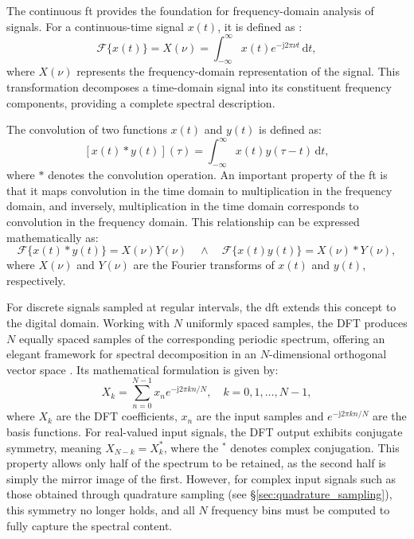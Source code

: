 The continuous \gls{ft} provides the foundation for frequency-domain analysis of signals. For a continuous-time signal $x(t)$, it is defined as \citep[see][Chapter 2]{Bracewell2000}:
\begin{equation}
	\mathcal{F}\{x(t)\} = X(\nu) = \int_{-\infty}^{\infty} x(t) e^{-\mathrm{j}2\pi\nu t} \, \mathrm{d}t ,
\end{equation}
where $X(\nu)$ represents the frequency-domain representation of the signal. This transformation decomposes a time-domain signal into its constituent frequency components, providing a complete spectral description. 

The convolution of two functions $x(t)$ and $y(t)$ is defined as:
\begin{equation}
	\left[x(t) * y(t)\right](\tau) = \int_{-\infty}^{\infty} x(t) y(\tau - t) \, \mathrm{d}t ,
\end{equation}
where $*$ denotes the convolution operation. An important property of the \gls{ft} is that it maps convolution in the time domain to multiplication in the frequency domain, and inversely, multiplication in the time domain corresponds to convolution in the frequency domain. This relationship can be expressed mathematically as:
\begin{equation}
	\mathcal{F}\{x(t) * y(t)\} = X(\nu) Y(\nu)  \quad \land \quad \mathcal{F}\{x(t) y(t)\} = X(\nu) * Y(\nu) ,
	\label{eq:convolution_theorem}
\end{equation}
where $X(\nu)$ and $Y(\nu)$ are the Fourier transforms of $x(t)$ and $y(t)$, respectively.

For discrete signals sampled at regular intervals, the \gls{dft} extends this concept to the digital domain. Working with $N$ uniformly spaced samples, the DFT produces $N$ equally spaced samples of the corresponding periodic spectrum, offering an elegant framework for spectral decomposition in an $N$-dimensional orthogonal vector space \citep{Cooley1969finite}. Its mathematical formulation is given by:
\begin{equation}
	X_k = \sum_{n=0}^{N-1} x_n e^{-\mathrm{j} 2 \pi k n / N}, \quad k = 0, 1, \ldots, N-1,
	\label{eq:dft}
\end{equation}
where $X_k$ are the DFT coefficients, $x_n$ are the input samples and $e^{-\mathrm{j} 2 \pi k n / N}$ are the basis functions. 
For real-valued input signals, the DFT output exhibits conjugate symmetry, meaning $X_{N-k} = X^*_k$, where the $^*$ denotes complex conjugation. This property allows only half of the spectrum to be retained, as the second half is simply the mirror image of the first. However, for complex input signals such as those obtained through quadrature sampling (see \S\ref{sec:quadrature_sampling}), this symmetry no longer holds, and all $N$ frequency bins must be computed to fully capture the spectral content. 

